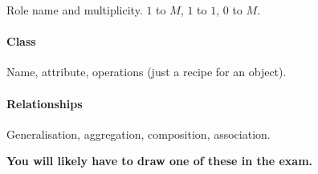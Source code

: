 Role name and multiplicity.
\(1\) to \(M\), \(1\) to \(1\), \(0\) to \(M\).

\begin{center}
\end{center}

\paragraph{Class}\label{par:class}

Name, attribute, operations (just a recipe for an object).

\paragraph{Relationships}\label{par:relationships}

Generalisation, aggregation, composition, association.

\bigskip
\noindent
\textbf{You will likely have to draw one of these in the exam.}

